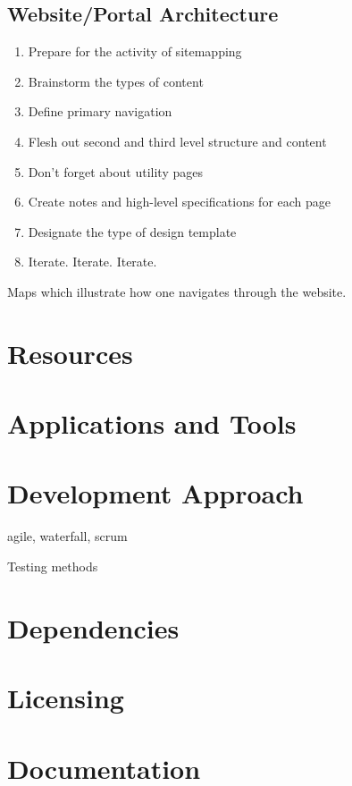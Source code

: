 \documentclass[12pt,onecolumn]{IEEEtran}
\begin{document}
\subsection{Website/Portal Architecture} \label{sec:WebsiteArchitecture}

\begin{enumerate}
\item Prepare for the activity of sitemapping
\item Brainstorm the types of content
\item Define primary navigation
\item Flesh out second and third level structure and content
\item Don’t forget about utility pages
\item Create notes and high-level specifications for each page
\item Designate the type of design template
\item Iterate. Iterate. Iterate.
\end{enumerate}

Maps which illustrate how one navigates through the website. 

\section{Resources} \label{sec:Resources}

\section{Applications and Tools} \label{sec:ApplicationsAndTools}

\section{Development Approach} \label{sec:Development Approach}

agile, waterfall, scrum

Testing methods

\section{Dependencies} \label{sec:Dependencies}


\section{Licensing} \label{sec:Licensing}

\section{Documentation} \label{sec:Documentation}
\end{document}
